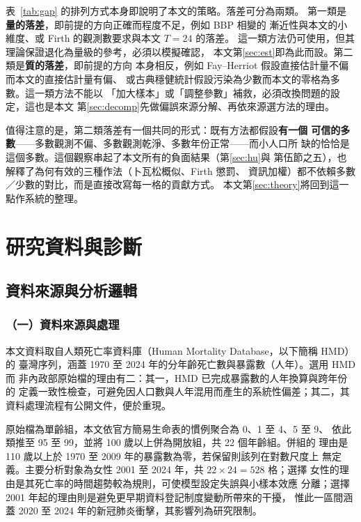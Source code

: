\documentclass[UTF8, fontset=macnew, a4paper, 12pt]{ctexart}
\begin{document}
表~\ref{tab:gap} 的排列方式本身即說明了本文的策略。落差可分為兩類。
第一類是\textbf{量的落差}，即前提的方向正確而程度不足，例如 BBP 相變的
漸近性與本文的小維度、或 Firth 的觀測數要求與本文 $T=24$ 的落差。
這一類方法仍可使用，但其理論保證退化為量級的參考，必須以模擬確認，
本文第\ref{sec:est}即為此而設。第二類是\textbf{質的落差}，即前提的方向
本身相反，例如 Fay--Herriot 假設直接估計量不偏而本文的直接估計量有偏、
或古典穩健統計假設污染為少數而本文的零格為多數。這一類方法不能以
「加大樣本」或「調整參數」補救，必須改換問題的設定，這也是本文
第\ref{sec:decomp}先做偏誤來源分解、再依來源選方法的理由。

值得注意的是，第二類落差有一個共同的形式：既有方法都假設\textbf{有一個
可信的多數}——多數觀測不偏、多數觀測乾淨、多數年份正常——而小人口所
缺的恰恰是這個多數。這個觀察串起了本文所有的負面結果（第\ref{sec:hu}與
第伍節之五），也解釋了為何有效的三種作法（卜瓦松概似、Firth 懲罰、
資訊加權）都不依賴多數／少數的對比，而是直接改寫每一格的貢獻方式。
本文第\ref{sec:theory}將回到這一點作系統的整理。

\section{研究資料與診斷}

\subsection{資料來源與分析邏輯}

\subsubsection{（一）資料來源與處理}

本文資料取自人類死亡率資料庫（Human Mortality Database，以下簡稱 HMD）的
臺灣序列，涵蓋 1970 至 2024 年的分年齡死亡數與暴露數（人年）。選用 HMD 而
非內政部原始檔的理由有二：其一，HMD 已完成暴露數的人年換算與跨年份的
定義一致性檢查，可避免因人口數與人年混用而產生的系統性偏差；其二，其
資料處理流程有公開文件，便於重現。

原始檔為單齡組，本文依官方簡易生命表的慣例聚合為 0、1 至 4、5 至 9、
依此類推至 95 至 99，並將 100 歲以上併為開放組，共 22 個年齡組。併組的
理由是 110 歲以上於 1970 至 2009 年的暴露數為零，若保留則該列在對數尺度上
無定義。主要分析對象為女性 2001 至 2024 年，共 $22\times24=528$ 格；選擇
女性的理由是其死亡率的時間趨勢較為規則，可使模型設定失誤與小樣本效應
分離；選擇 2001 年起的理由則是避免更早期資料登記制度變動所帶來的干擾，
惟此一區間涵蓋 2020 至 2024 年的新冠肺炎衝擊，其影響列為研究限制。
\end{document}
